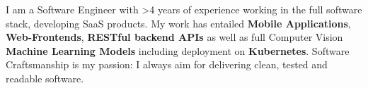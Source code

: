 \documentclass[8pt]{developercv} %
\begin{document}
\vspace{0.5cm}



\begin{minipage}[t]{0.4\textwidth} %
	\vspace{-\baselineskip} %
	
	I am a Software Engineer with >4 years of experience working in the full software stack, developing SaaS products.
	My work has entailed \textbf{Mobile Applications}, \textbf{Web-Frontends}, \textbf{RESTful backend APIs} as well as full Computer Vision \textbf{Machine Learning Models} including deployment on \textbf{Kubernetes}. Software Craftsmanship is my passion: I always aim for delivering clean, tested and readable software.
\end{minipage}
\hfill %
\begin{minipage}[t]{0.5\textwidth} %
	\vspace{-\baselineskip} %
	\begin{barchart}{5.5}
	\end{barchart}
\end{minipage}



\end{document}
